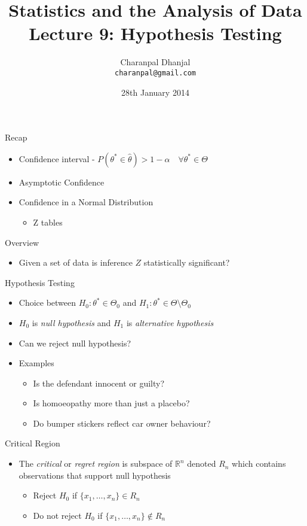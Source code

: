 \documentclass{beamer}
\title{Statistics and the Analysis of Data\\ Lecture 9: Hypothesis Testing}
\author{Charanpal Dhanjal \\ \texttt{charanpal@gmail.com}}
\institute{\'{E}cole des Ponts}
\date{28th January 2014}
\begin{document}
\frame{\titlepage}

\begin{frame}{Recap}  
\begin{itemize} 
 \item Confidence interval -  $P(\theta^* \in \hat{\theta}) > 1 - \alpha \quad \forall \theta^* \in \Theta $
 \item Asymptotic Confidence
 \item Confidence in a Normal Distribution
\begin{itemize} 
\item Z tables 
\end{itemize}
\end{itemize} 
\end{frame}

\begin{frame}{Overview}
\begin{itemize} 
 \item Given a set of data is inference $Z$ statistically significant?
\end{itemize}
\end{frame}

\begin{frame}{Hypothesis Testing}  
\begin{itemize} 
\item Choice between $H_0: \theta^* \in \Theta_0$ and $H_1: \theta^* \in \Theta \setminus \Theta_0$
\item $H_0$ is \emph{null hypothesis} and $H_1$ is \emph{alternative hypothesis} 
\item Can we reject null hypothesis? 
\item Examples 
\begin{itemize} 
\item Is the defendant innocent or guilty? 
\item Is homoeopathy more than just a placebo? 
\item Do bumper stickers reflect car owner behaviour? 
\end{itemize}
\end{itemize}
\end{frame}

\begin{frame}{Critical Region} 
\begin{itemize} 
 \item The \emph{critical} or \emph{regret region} is subspace of $\mathbb{R}^n$ denoted $R_n$ which contains observations that support null hypothesis 
 \begin{itemize}
 \item Reject $H_0$ if $\{x_1, \ldots, x_n\} \in R_n$ 
 \item Do not reject $H_0$ if $\{x_1, \ldots, x_n\} \notin R_n$ 
 \end{itemize} 
\end{itemize}
\end{frame}
\end{document}
